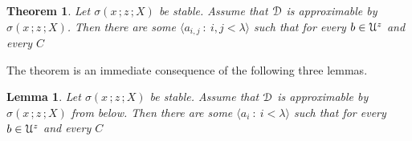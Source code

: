 \documentclass{amsproc}
\makeatletter
\newcounter{thm}
\theoremstyle{mio}
\newtheorem{theorem}[thm]{Theorem}\tcolorboxenvironment{theorem}{mythm}
\newtheorem{lemma}[thm]{Lemma}\tcolorboxenvironment{lemma}{mythm}
\providecommand{\proofNameStyle}{\bfseries}
\renewenvironment{proof}[1][\proofname]{\par
  \pushQED{\qed}%
  \normalfont%
  \trivlist
  \item[\hskip\labelsep
        \proofNameStyle
    #1\@addpunct{.}]\ignorespaces
}{%
  \popQED\endtrivlist\@endpefalse
}
\makeatother
\begin{document}
\begin{theorem}\label{thm_stability_definability}
  Let $\sigma(x\,;z\,;X)$ be stable.
  Assume that ${\EuScript D}$ is approximable by $\sigma(x\,;z\,;X)$.
  Then there are some $\langle a_{i,j}\ :\ i,j<\lambda\rangle$ such that for every $b\in{\EuScript U}^z$ and every $C$\medskip

  \medskip

\end{theorem}

\begin{proof}
  The theorem is an immediate consequence of the following three lemmas.
\end{proof}

\begin{lemma}\label{lem_1_inf}
  Let $\sigma(x\,;z\,;X)$ be stable.
  Assume that ${\EuScript D}$ is approximable by $\sigma(x\,;z\,;X)$ from below.
  Then there are some $\langle a_i\ :\ i<\lambda\rangle$ such that for every $b\in{\EuScript U}^z$ and every $C$\medskip

  \medskip 

\end{lemma}
\end{document}
